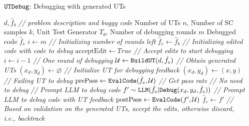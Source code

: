\begin{algorithm}[!t]
\caption{$\tt{UTDebug}$: Debugging with generated UTs}
\label{alg:debug}
\begin{algorithmic}{}
     $d, \hat{f}_b$ \textcolor{comm}{\footnotesize{\textit{// problem description and buggy code}}}
      Number of UTs $n$, Number of SC samples $k$, Unit Test Generator $T_\theta$, Number of debugging rounds $m$
     Debugged code $\hat{f}_e$
    \State $i \gets m$  \textcolor{comm}{\footnotesize{\textit{// Initializing number of rounds left}}}
    \State $\hat{f}_e \gets \hat{f}_b$  \textcolor{comm}{\footnotesize{\textit{// Initializing edited code with code to debug}}} 
    \State $\mathrm{acceptEdit} \gets True$  \textcolor{comm}{\footnotesize{\textit{// Accept edits to start debugging}}} 
    \State $i \gets i - 1$ \textcolor{comm}{\footnotesize{\textit{// One round of debugging}}} 
    \State $\mathcal{U} \gets {\tt{BuildUT}}(d, \hat{f}_e)$ \textcolor{comm}{\footnotesize{\textit{// Obtain generated UTs}}}
    \State $(x_d, y_d) \gets \varnothing$ \textcolor{comm}{\footnotesize{\textit{// Initialize UT for debugging feedback}}}
    \State $(x_d, y_d) \gets (x,y) $  \textcolor{comm}{\footnotesize{\textit{// Failing UT  to debug}}}
    \EndIf
    \State $\mathrm{prePass} \gets {\tt{EvalCode}}(\hat{f}_e, \mathcal{U})$ \textcolor{comm}{\footnotesize{\textit{ // Get pass rate}}} 
     \textcolor{comm}{\footnotesize{\textit{// No need to debug}}} 
    \State {}
    \Else \textcolor{comm}{\footnotesize{\textit{ // Prompt LLM to debug code}}} 
    \State $f'\sim{\tt{LLM}}(\hat{f}_e | {\tt Debug}(x_d, y_d, \hat{f_e}))$
    \textcolor{comm}{\footnotesize{\textit{ // Prompt LLM to debug code with UT feedback}}} 
    \State $\mathrm{postPass} \gets {\tt{EvalCode}}(f', \mathcal{U})$ 
    \State $\hat{f}_e \gets f'$  \textcolor{comm}{\footnotesize{\textit{ // Based on validation on the generated UTs, accept the edits, otherwise discard, i.e., backtrack}}} 
    \EndIf
    \EndIf
    \EndFor
    \EndIf
    \EndWhile
\end{algorithmic}
\end{algorithm}